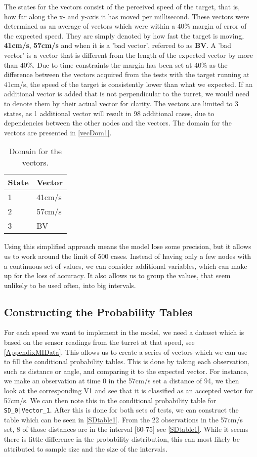 The states for the vectors consist of the perceived speed of the target, that
is, how far along the x- and y-axis it has moved per millisecond. These vectors
were determined as an average of vectors which were within a 40\% margin of
error of the expected speed. They are simply denoted by how fast
the target is moving, \textbf{41cm/s}, \textbf{57cm/s} and when it is a 'bad
vector', referred to as \textbf{BV}. A 'bad vector' is a vector that is
different from the length of the expected vector by more than 40\%. Due to
time constraints the margin has been set at 40\% as the difference between the
vectors acquired from the tests with the target running at 41cm/s, the speed of
the target is consistently lower than what we expected. If an additional
vector is added that is not perpendicular to the turret, we would
need to denote them by their actual vector for clarity. The vectors are limited
to 3 states, as 1 additional vector will result in 98 additional cases, due to
dependencies between the other nodes and the vectors.
The domain for the vectors are presented in \autoref{vecDom1}.

\begin{table}[H]
\centering
\begin{tabular}{l|l}
State & Vector \\ \hline
1     & 41cm/s \\
2     & 57cm/s \\
3     & BV
\end{tabular}
\caption{Domain for the vectors.}
\label{vecDom1}
\end{table}

Using this simplified approach means the model lose some precision, but it
allows us to work around the limit of 500 cases. Instead of having only a few
nodes with a continuous set of values, we can consider additional variables,
which can make up for the loss of accuracy. It also allows us to group the
values, that seem unlikely to be used often, into big intervals.

\subsection{Constructing the Probability Tables}

For each speed we want to implement in the model, we need a dataset which is
based on the sensor readings from the turret at that speed, see
\autoref{AppendixMIData}. This allows us to create a series of vectors which we
can use to fill the conditional probability tables. This is done by taking each
observation, such as distance or angle, and comparing it to the expected vector.
For instance, we make an observation at time 0 in the 57cm/s set a distance of
94, we then look at the corresponding V1 and see that it is classified as an accepted
vector for 57cm/s. We can then note this in the conditional probability table
for \texttt{SD\_0|Vector\_1}. After this is done for both sets of tests, we can
construct the table which can be seen in \autoref{SDtable1}. From the 22
observations in the 57cm/s set, 8 of those distances are in the interval [60-75]
see \autoref{SDtable1}. While it seems there is little difference in the
probability distribution, this can most likely be attributed to sample size and
the size of the intervals.

